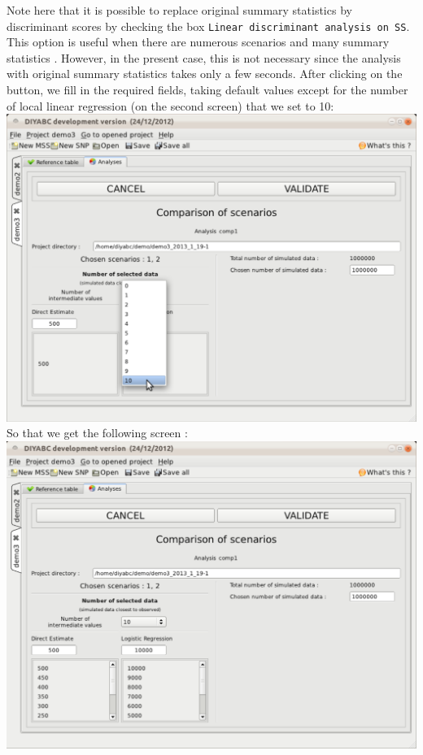 Note here that it is possible to replace original summary statistics by discriminant scores by checking the box \texttt{Linear discriminant analysis on SS}. This option is useful when there are numerous scenarios and many summary statistics \citep{EL2012}. However, in the present case, this is not necessary since the analysis with original summary statistics takes only a few seconds. After clicking on the  button, we fill in the required fields, taking default values except for the number of local linear regression (on the second screen) that we set to 10:\\

\includegraphics[scale=0.3]{gui_pictures/Capture-DIYABC-109.png} \\

So that we get the following screen :\\

\includegraphics[scale=0.3]{gui_pictures/Capture-DIYABC-110.png} \\

